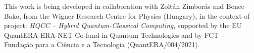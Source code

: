 \vspace*{\fill}

This work is being developed in collaboration with Zoltán Zimborás and Bence Bako, from the Wigner Research Centre for Physics (Hungary), in the context of project: \textit{HQCC – Hybrid Quantum-Classical Computing}, supported by the EU QuantERA ERA-NET Co-fund in Quantum Technologies and by FCT -- Funda\c{c}\~{a}o para a Ci\^{e}ncia e a Tecnologia (QuantERA/004/2021).

